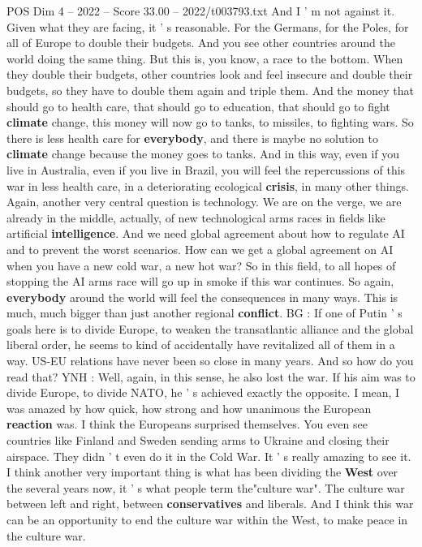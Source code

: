 \begin{textsample}{POS Dim 4 – 2022 – Score 33.00 – 2022/t003793.txt}
And I ' m not against it.
Given what they are facing, it ' s reasonable.
For the Germans, for the Poles, for all of Europe to double their budgets.
And you see other countries around the world doing the same thing.
But this is, you know, a race to the bottom.
When they double their budgets, other countries look and feel insecure and double their budgets, so they have to double them again and triple them.
And the money that should go to health care, that should go to education, that should go to fight \textbf{climate} change, this money will now go to tanks, to missiles, to fighting wars.
So there is less health care for \textbf{everybody}, and there is maybe no solution to \textbf{climate} change because the money goes to tanks.
And in this way, even if you live in Australia, even if you live in Brazil, you will feel the repercussions of this war in less health care, in a deteriorating ecological \textbf{crisis}, in many other things.
Again, another very central question is technology.
We are on the verge, we are already in the middle, actually, of new technological arms races in fields like artificial \textbf{intelligence}.
And we need global agreement about how to regulate AI and to prevent the worst scenarios.
How can we get a global agreement on AI when you have a new cold war, a new hot war?
So in this field, to all hopes of stopping the AI arms race will go up in smoke if this war continues.
So again, \textbf{everybody} around the world will feel the consequences in many ways.
This is much, much bigger than just another regional \textbf{conflict}.
BG : If one of Putin ' s goals here is to divide Europe, to weaken the transatlantic alliance and the global liberal order, he seems to kind of accidentally have revitalized all of them in a way.
US-EU relations have never been so close in many years.
And so how do you read that?
YNH : Well, again, in this sense, he also lost the war.
If his aim was to divide Europe, to divide NATO, he ' s achieved exactly the opposite.
I mean, I was amazed by how quick, how strong and how unanimous the European \textbf{reaction} was.
I think the Europeans surprised themselves.
You even see countries like Finland and Sweden sending arms to Ukraine and closing their airspace.
They didn ' t even do it in the Cold War.
It ' s really amazing to see it.
I think another very important thing is what has been dividing the \textbf{West} over the several years now, it ' s what people term the"culture war".
The culture war between left and right, between \textbf{conservatives} and liberals.
And I think this war can be an opportunity to end the culture war within the West, to make peace in the culture war.

\end{textsample}

